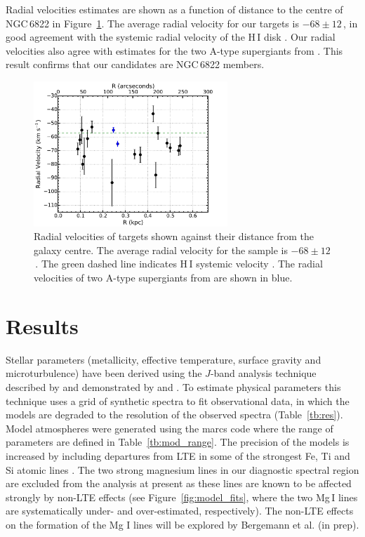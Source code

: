 Radial velocities estimates are shown as a function of distance to the centre of NGC\,6822 in Figure~\ref{fig:RvsRV}.
The average radial velocity for our targets is $-68\pm12$\,\kms,
in good agreement with the systemic radial velocity of the H\,I disk
\citep[$-57\pm2$\,\kms;][]{2004AJ....128...16K}.
Our radial velocities also agree with estimates for the two A-type supergiants from
\cite{2001ApJ...547..765V}.
This result confirms that our candidates are NGC\,6822 members.

\begin{figure}
 \centering
\includegraphics[width=0.65\textwidth]{ngc6822/N6822_RvsRV}
\caption{
Radial velocities of targets shown against their distance from the galaxy centre.
The average radial velocity for the sample is $-68\pm12$\,\kms.
The green dashed line indicates H\,I systemic velocity
\protect\citep[$-57\pm2$\,\kms;][]{2004AJ....128...16K}.
The radial velocities of two A-type supergiants from
\protect\cite{2001ApJ...547..765V} are shown in blue.
        }
\label{fig:RvsRV}
\end{figure}



\section{Results} %
\label{sec:results}

Stellar parameters
(metallicity, effective temperature, surface gravity and microturbulence)
have been derived using the $J$-band analysis technique described by
\cite{2010MNRAS.407.1203D} and demonstrated by
\cite{2014ApJ...788...58G} and
\cite{Davies-prep}.
To estimate physical parameters this technique uses a grid of synthetic spectra to fit observational data,
in which the models are degraded to the resolution of the observed spectra
(Table~\ref{tb:res}).
Model atmospheres were generated using the {\sc marcs} code
\citep{2008A&A...486..951G} where the range of parameters are defined in
Table~\ref{tb:mod_range}.
The precision of the models is increased by including departures from LTE in some of the strongest Fe, Ti and Si atomic lines
\citep{2012ApJ...751..156B,2013ApJ...764..115B}.
The two strong magnesium lines in our diagnostic spectral region are excluded from the analysis at present as these lines are known to be affected strongly by non-LTE effects
(see Figure~\ref{fig:model_fits}, where the two Mg\,I lines are systematically under- and over-estimated, respectively).
The non-LTE effects on the formation of the Mg I lines will be explored by
Bergemann et al. (in prep).

